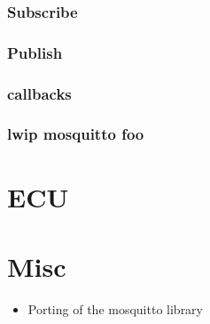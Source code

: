 \documentclass[paper=a4, fontsize=11pt]{scrartcl}
\begin{document}
  \subsubsection{Subscribe}
  \subsubsection{Publish}
  \subsubsection{callbacks}
  \subsubsection{lwip mosquitto foo}
\section{ECU}
\section{Misc}
\begin{itemize}
  \item Porting of the mosquitto library %
\end{itemize}
\end{document}

